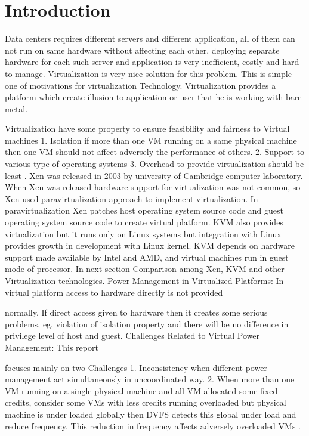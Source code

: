 \documentclass[seminar,twoside]{iitbreport}
\begin{document}
%
%
%
%

\section {Introduction}
Data centers requires different servers and different application, all of them can
not run on same hardware without affecting each other, deploying separate 
hardware for each such server and application is very inefficient, costly and hard
to manage. Virtualization is very nice solution for this problem. This is simple one of 
motivations for virtualization Technology. Virtualization provides a platform
which create illusion to application or user that he is working with bare metal.

Virtualization have some property to ensure feasibility and fairness to Virtual machines 
1. Isolation if more than one VM running on a same physical machine then one
VM should not affect adversely the performance of others. 
2. Support to various type of operating systems 
3. Overhead to provide virtualization should be least \cite{xen}. 
Xen was released in 2003 by university of Cambridge computer laboratory.
When Xen was released hardware support for virtualization was not common, 
so Xen used paravirtualization approach to implement virtualization. 
In paravirtualization Xen patches host operating system source code and guest operating
system source code to create virtual platform. KVM also provides virtualization but it 
runs only on Linux systems but integration with Linux provides growth in
development with Linux kernel. KVM depends on hardware support made available by Intel
and AMD, and virtual machines run in guest mode of processor.\cite{kvm} In next section Comparison 
among Xen, KVM and other Virtualization technologies. Power Management in
Virtualized Platforms: In virtual platform access to hardware directly is not provided

normally. If direct access given to hardware then it creates some serious problems, eg. 
violation of isolation property and there will be no difference in privilege level of host
and guest. Challenges Related to Virtual Power Management: This report

focuses mainly on two Challenges 1. Inconsistency when different power management act
simultaneously in uncoordinated way. \cite{nostruggle} 2. When more than one VM running on a single
physical machine and all VM allocated some fixed credits, consider some VMs with
less credits running overloaded but physical machine is under loaded globally then DVFS
detects this global under load and reduce frequency. This reduction in frequency affects
adversely overloaded VMs \cite{dvfs}.
\end{document}
